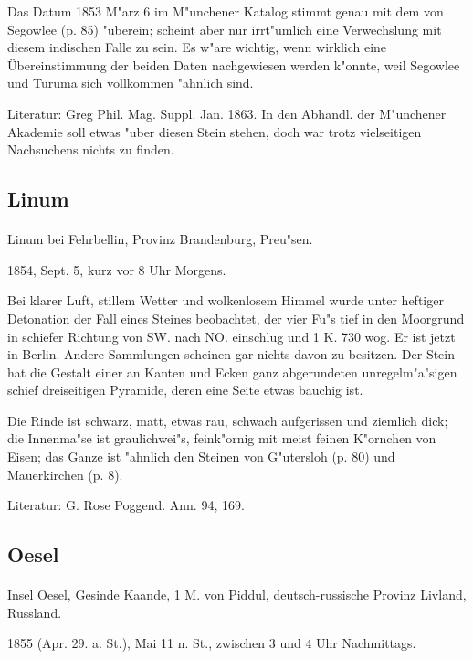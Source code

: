 \documentclass[a4paper, 11pt, oneside]{article}
\begin{document}
Das Datum 1853 M"arz 6 im M"unchener Katalog stimmt genau mit dem von Segowlee (p. 85) "uberein; scheint aber nur irrt"umlich eine Verwechslung mit diesem indischen Falle zu sein. Es w"are wichtig, wenn wirklich eine Übereinstimmung der beiden Daten nachgewiesen werden k"onnte, weil Segowlee und Turuma sich vollkommen "ahnlich sind.

\footnotesize
Literatur: Greg Phil. Mag. Suppl. Jan. 1863. In den Abhandl. der M"unchener Akademie soll etwas "uber diesen Stein stehen, doch war trotz vielseitigen Nachsuchens nichts zu finden.

\subsection{Linum}
\normalsize
\paragraph{}
Linum bei Fehrbellin, Provinz Brandenburg, Preu"sen.

1854, Sept. 5, kurz vor 8 Uhr Morgens.

Bei klarer Luft, stillem Wetter und wolkenlosem Himmel wurde unter heftiger Detonation der Fall eines Steines beobachtet, der vier Fu"s tief in den Moorgrund in schiefer Richtung von SW. nach NO. einschlug und 1 K. 730 wog. Er ist jetzt in Berlin. Andere Sammlungen scheinen gar nichts davon zu besitzen. Der Stein hat die Gestalt einer an Kanten und Ecken ganz abgerundeten unregelm"a"sigen schief dreiseitigen Pyramide, deren eine Seite etwas bauchig ist.

Die Rinde ist schwarz, matt, etwas rau, schwach aufgerissen und ziemlich dick; die Innenma"se ist graulichwei"s, feink"ornig mit meist feinen K"ornchen von Eisen; das Ganze ist "ahnlich den Steinen von G"utersloh (p. 80) und Mauerkirchen (p. 8).

\footnotesize
Literatur: G. Rose Poggend. Ann. 94, 169.

\subsection{Oesel}
\normalsize
\paragraph{}
Insel Oesel, Gesinde Kaande, 1 M. von Piddul, deutsch-russische Provinz Livland, Russland.

1855 (Apr. 29. a. St.), Mai 11 n. St., zwischen 3 und 4 Uhr Nachmittags.
\end{document}
